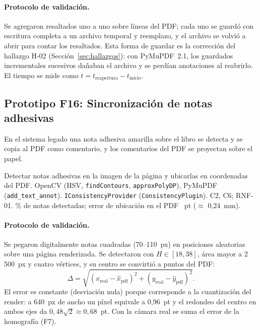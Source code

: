 \paragraph{Protocolo de validación.} Se agregaron \FQuinceAnotaciones{} resaltados uno a uno sobre líneas del PDF; cada uno se guardó con escritura completa a un archivo temporal y reemplazo, y el archivo se volvió a abrir para contar los resaltados. Esta forma de guardar es la corrección del hallazgo H-02 (Sección~\ref{sec:hallazgos}): con PyMuPDF~2.1, los guardados incrementales sucesivos dañaban el archivo y se perdían anotaciones al reabrirlo. El tiempo se mide como $t=t_{\text{reapertura}}-t_{\text{inicio}}$.

\subsection{Prototipo F16: Sincronización de notas adhesivas}

En el sistema legado \citep{pezoa2020} una nota adhesiva amarilla sobre el libro se detecta y se copia al PDF como comentario, y los comentarios del PDF se proyectan sobre el papel.

{Detectar notas adhesivas en la imagen de la página y ubicarlas en coordenadas del PDF.}
{OpenCV (HSV, \texttt{findContours}, \texttt{approxPolyDP}), PyMuPDF (\texttt{add\_text\_annot}).}
{\texttt{IConsistencyProvider} (\texttt{ConsistencyPlugin}).}
{C2, C6; RNF-01.}
{ \FDieciseisDetectadasPct\% de \FDieciseisNotas{} notas detectadas; error de ubicación en el PDF \FDieciseisErrorPt~pt ($\approx$ 0,24~mm).\newline {}}

\paragraph{Protocolo de validación.} Se pegaron digitalmente \FDieciseisNotas{} notas cuadradas (70--110~px) en posiciones aleatorias sobre una página renderizada. Se detectaron con $H\in[18,38]$, área mayor a 2\,500~px y cuatro vértices, y su centro se convirtió a puntos del PDF:
\begin{equation}
\Delta=\sqrt{(x_{\text{real}}-\hat{x}_{\text{pdf}})^2+(y_{\text{real}}-\hat{y}_{\text{pdf}})^2}.
\end{equation}
El error es constante (desviación nula) porque corresponde a la cuantización del render: a 640~px de ancho un píxel equivale a 0,96~pt y el redondeo del centro en ambos ejes da $0{,}48\sqrt{2}\approx0{,}68$~pt. Con la cámara real se suma el error de la homografía (F7).

